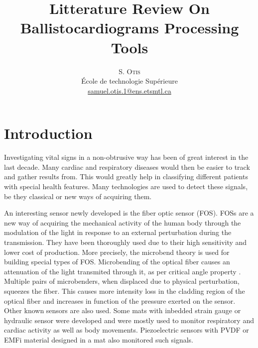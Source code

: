 \documentclass[twoside,onecolumn]{article}
\title{Litterature Review On Ballistocardiograms Processing Tools} %
\author{%
\textsc{S. Otis}\\[1ex]%
\normalsize École de technologie Supérieure \\ %
\normalsize \href{mailto:samuel.otis.1@ens.etsmtl.ca}{samuel.otis.1@ens.etsmtl.ca}
}
\begin{document}

\maketitle
\section{Introduction}
Investigating vital signs in a non-obtrusive way has been of great interest in the last decade. Many cardiac and respiratory diseases would then be easier to track and gather results from. This would greatly help in classifying different patients with special health features. Many technologies are used to detect these signals, be they classical or new ways of acquiring them. 

An interesting sensor newly developed is the fiber optic sensor (FOS). FOSs are a new way of acquiring the mechanical activity of the human body through the modulation of the light in response to an external perturbation during the transmission. They have been thoroughly used due to their high sensitivity and lower cost of production. More precisely, the microbend theory is used for building special types of FOS. Microbending of the optical fiber causes an attenuation of the light transmited through it, as per critical angle property \cite{udd_overview_1995}. Multiple pairs of microbenders, when displaced due to physical perturbation, squeezes the fiber. This causes more intensity loss in the cladding region of the optical fiber and increases in function of the pressure exerted on the sensor. 
Other known sensors are also used. Some mats with inbedded strain gauge or hydraulic sensor were developed and were mostly used to monitor respiratory and cardiac activity as well as body movements.  Piezoelectric sensors with PVDF or EMFi material designed in a mat also monitored such signals.
\end{document}
